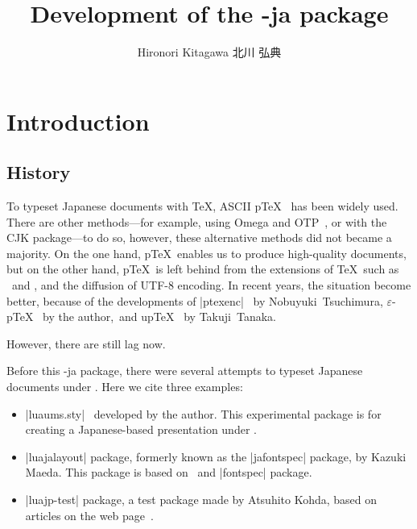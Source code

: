 \documentclass{ajt}
\title{Development of the \LuaTeX-ja package}
\author{Hironori Kitagawa {\normalsize 北川 弘典}}
\begin{document}
\maketitle

\section{Introduction}
\subsection{History}
To typeset Japanese documents with \TeX, ASCII p\TeX~\cite{ptex} has
been widely used.  There are other methods---for example, using Omega
and OTP~\cite{omegaj}, or with the CJK package---to do so, however,
these alternative methods did not became a majority. On the one hand,
p\TeX\ enables us to produce high-quality documents, but on the other
hand, p\TeX\ is left behind from the extensions of \TeX\ such as \eTeX\
and \pdfTeX, and the diffusion of UTF-8 encoding.  In recent years, the
situation become better, because of the developments of
|ptexenc|~\cite{ptexenc} by Nobuyuki~Tsuchimura,
$\varepsilon$-p\TeX~\cite{eptex} by the author,~and up\TeX~\cite{uptex}
by Takuji~Tanaka.

However, there are still lag now. 


Before this \LuaTeX-ja package, there were several attempts to typeset
Japanese documents under \LuaTeX.  Here we cite three examples:
\begin{itemize}
\item |luaums.sty|~\cite{luaums} developed by the author. This
      experimental package is for creating a Japanese-based presentation
      under \LuaTeX.
\item |luajalayout| package\cite{luajalayout}, formerly known as the
      |jafontspec| package, by Kazuki Maeda. This package is based on
      \LaTeXe\ and |fontspec| package.
\item |luajp-test| package\cite{luajp-test}, a test package made by
      Atsuhito Kohda, based on articles on the web page~\cite{joylua}.
\end{itemize}
\end{document}
